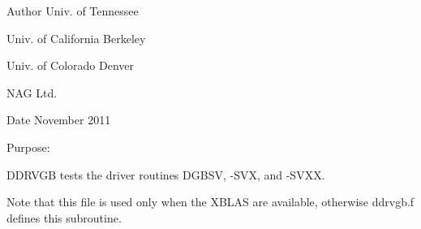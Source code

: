\begin{DoxyAuthor}{Author}
Univ. of Tennessee 

Univ. of California Berkeley 

Univ. of Colorado Denver 

N\+A\+G Ltd. 
\end{DoxyAuthor}
\begin{DoxyDate}{Date}
November 2011
\end{DoxyDate}
\begin{DoxyParagraph}{Purpose\+: }
\begin{DoxyVerb} DDRVGB tests the driver routines DGBSV, -SVX, and -SVXX.

 Note that this file is used only when the XBLAS are available,
 otherwise ddrvgb.f defines this subroutine.\end{DoxyVerb}
 
\end{DoxyParagraph}

